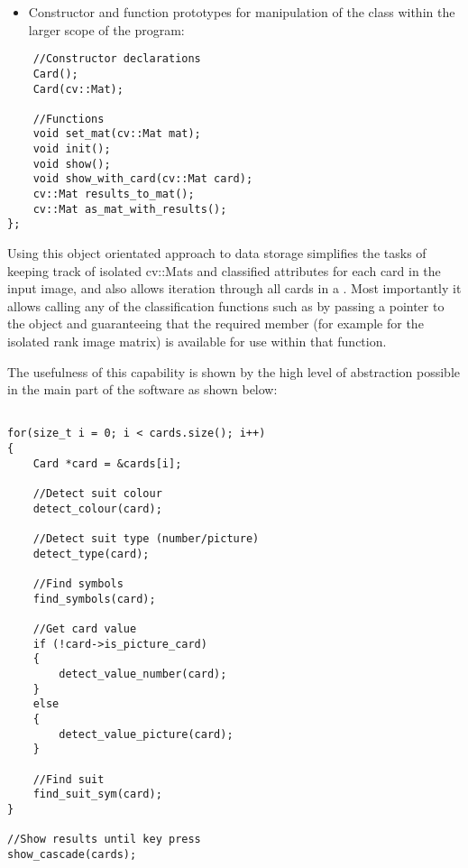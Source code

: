 \begin{itemize}
	\item Constructor and function prototypes for manipulation of the class within the larger scope of the program:
\end{itemize}

\begin{lstlisting}
	//Constructor declarations
	Card();
	Card(cv::Mat);

	//Functions
	void set_mat(cv::Mat mat);
	void init();
	void show();
	void show_with_card(cv::Mat card);
	cv::Mat results_to_mat();
	cv::Mat as_mat_with_results();
};
\end{lstlisting}

Using this object orientated approach to data storage simplifies the tasks of keeping track of isolated cv::Mats and classified attributes for each card in the input image, and also allows iteration through all cards in a . Most importantly it allows calling any of the classification functions such as  by passing a pointer to the object and guaranteeing that the required member (for example  for the isolated rank image matrix) is available for use within that function.

The usefulness of this capability is shown by the high level of abstraction possible in the main part of the software as shown below:

\begin{lstlisting}

for(size_t i = 0; i < cards.size(); i++)
{
    Card *card = &cards[i];

    //Detect suit colour
    detect_colour(card);

    //Detect suit type (number/picture)
    detect_type(card);

    //Find symbols
    find_symbols(card);

    //Get card value
    if (!card->is_picture_card)
    {
        detect_value_number(card);
    }
    else
    {
        detect_value_picture(card);
    }

    //Find suit
    find_suit_sym(card);
}

//Show results until key press
show_cascade(cards);
\end{lstlisting}